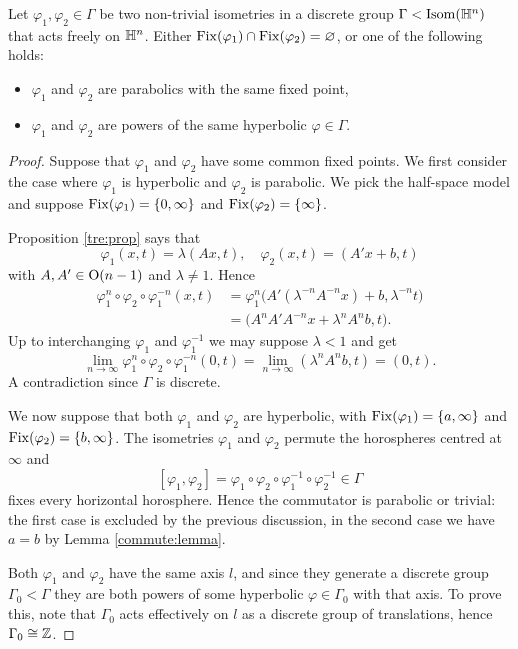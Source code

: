 \begin{lemma} \label{fissi:lemma}
Let $\varphi_1,\varphi_2\in\Gamma$ be two non-trivial isometries in a discrete group $\Gamma < {\rm Isom} (\mathbb{H}^n)$ that acts freely on $\mathbb{H}^n$. Either ${\rm Fix}(\varphi_1)\cap {\rm Fix}(\varphi_2) = \varnothing$, or one of the following holds:
\begin{itemize}
\item $\varphi_1$ and $\varphi_2$ are parabolics with the same fixed point,
\item $\varphi_1$ and $\varphi_2$ are powers of the same hyperbolic $\varphi \in \Gamma$.
\end{itemize}
\end{lemma}
\begin{proof}
Suppose that $\varphi_1$ and $\varphi_2$ have some common fixed points. We first consider the case where $\varphi_1$ is hyperbolic and $\varphi_2$ is parabolic. We pick the half-space model and suppose ${\rm Fix}(\varphi_1) = \{0,\infty\}$ and ${\rm Fix}(\varphi_2) = \{\infty\}$. 

Proposition \ref{tre:prop} says that 
$$\varphi_1(x,t) = \lambda(Ax,t), \quad \varphi_2(x,t) = (A'x+b, t)$$ 
with $A, A' \in {\rm O}(n-1)$ and $\lambda \neq 1$. Hence
\begin{align*}
\varphi_1^n\circ \varphi_2\circ  \varphi_1^{-n}(x,t) & = \varphi_1^n\big(A'(\lambda^{-n}A^{-n}x)+b,\lambda^{-n}t) \\
& = \big(A^nA'A^{-n}x + \lambda^n A^nb , t\big).
\end{align*}
Up to interchanging $\varphi_1$ and $\varphi_1^{-1}$ we may suppose $\lambda < 1$ and get
$$\lim_{n\to \infty} \varphi_1^n \circ \varphi_2 \circ \varphi_1^{-n}(0,t) = 
\lim_{n\to \infty} \left(\lambda^nA^nb, t\right) = (0,t).$$
A contradiction since $\Gamma$ is discrete.

We now suppose that both $\varphi_1$ and $\varphi_2$ are hyperbolic, with ${\rm Fix}(\varphi_1) = \{a,\infty\}$ and ${\rm Fix} (\varphi_2) = \{b,\infty\}$. The isometries $\varphi_1$ and $\varphi_2$ permute the horospheres centred at $\infty$ and
$$[\varphi_1,\varphi_2] = \varphi_1\circ \varphi_2 \circ \varphi_1^{-1} \circ \varphi_2^{-1} \in \Gamma$$
fixes every horizontal horosphere. Hence the commutator is parabolic or trivial: the first case is excluded by the previous discussion, in the second case we have $a=b$ by Lemma \ref{commute:lemma}. 

Both $\varphi_1$ and $\varphi_2$ have the same axis $l$, and since they generate a discrete group $\Gamma_0 < \Gamma$ they are both powers of some hyperbolic $\varphi\in\Gamma_0$ with that axis. To prove this, note that $\Gamma_0$ acts effectively on $l$ as a discrete group of translations, hence $\Gamma_0 \cong \mathbb{Z}$. \end{proof}


